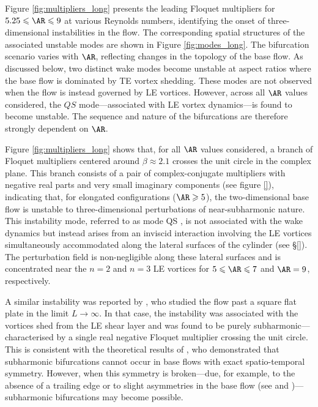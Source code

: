 Figure \ref{fig:multipliers_long} presents the leading Floquet multipliers for $5.25 \le \AR \le 9$ at various Reynolds numbers, identifying the onset of three-dimensional instabilities in the flow. The corresponding spatial structures of the associated unstable modes are shown in Figure \ref{fig:modes_long}. The bifurcation scenario varies with $\AR$, reflecting changes in the topology of the base flow. As discussed below, two distinct wake modes become unstable at aspect ratios where the base flow is dominated by TE vortex shedding. These modes are not observed when the flow is instead governed by LE vortices. However, across all $\AR$ values considered, the $QS$ mode---associated with LE vortex dynamics---is found to become unstable. The sequence and nature of the bifurcations are therefore strongly dependent on $\AR$.

Figure \ref{fig:multipliers_long} shows that, for all $\AR$ values considered, a branch of Floquet multipliers centered around $\beta \approx 2.1$ crosses the unit circle in the complex plane. This branch consists of a pair of complex-conjugate multipliers with negative real parts and very small imaginary components (see figure \ref{}), indicating that, for elongated configurations ($\AR \ge 5$), the two-dimensional base flow is unstable to three-dimensional perturbations of near-subharmonic nature. This instability mode, referred to as mode QS \citep{}, is not associated with the wake dynamics but instead arises from an inviscid interaction involving the LE vortices simultaneously accommodated along the lateral surfaces of the cylinder (see \S\ref{}). The perturbation field is non-negligible along these lateral surfaces and is concentrated near the $n=2$ and $n=3$ LE vortices for $5 \le \AR \le 7$ and $\AR = 9$, respectively.

A similar instability was reported by \cite{}, who studied the flow past a square flat plate in the limit $L \rightarrow \infty$. In that case, the instability was associated with the vortices shed from the LE shear layer and was found to be purely subharmonic---characterised by a single real negative Floquet multiplier crossing the unit circle. This is consistent with the theoretical results of \cite{}, who demonstrated that subharmonic bifurcations cannot occur in base flows with exact spatio-temporal symmetry. However, when this symmetry is broken---due, for example, to the absence of a trailing edge or to slight asymmetries in the base flow (see \cite{} and \cite{})---subharmonic bifurcations may become possible.

